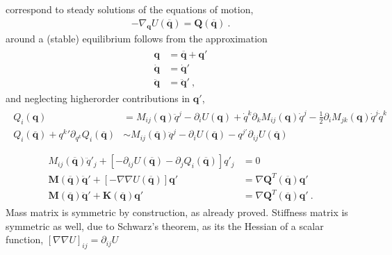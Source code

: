 \documentclass[letterpaper,10pt,english]{jupyterBook}
\begin{document}
\sphinxAtStartPar
{} correspond to steady solutions of the equations of motion,
\begin{equation*}
\begin{split}-\nabla_{\mathbf{q}} U (\overline{\mathbf{q}}) = \mathbf{Q}(\overline{\mathbf{q}}) \ .\end{split}
\end{equation*}
\sphinxAtStartPar
{} around a (stable) equilibrium follows from the approximation
\begin{equation*}
\begin{split}\begin{aligned}
  \mathbf{q}        & = \overline{\mathbf{q}} + \mathbf{q}'  \\
  \dot{\mathbf{q}}  & =                    \dot{\mathbf{q}}' \\
  \ddot{\mathbf{q}} & =                   \ddot{\mathbf{q}}' \ ,
\end{aligned}\end{split}
\end{equation*}
\sphinxAtStartPar
and neglecting higher\sphinxhyphen{}order contributions in \(\mathbf{q}'\),
\begin{equation*}
\begin{split}\begin{aligned}
Q_i (\mathbf{q})
  & = M_{ij}(\mathbf{q}) \ddot{q}^j - \partial_i U(\mathbf{q}) + \dot{q}^k \partial_k M_{ij}(\mathbf{q}) \dot{q}^j - \frac{1}{2} \partial_i M_{jk}(\mathbf{q}) \dot{q}^j \dot{q}^k  \\
  Q_i(\overline{\mathbf{q}}) + {q^{k}}' \partial_{q^k} Q_i(\overline{\mathbf{q}}) & \sim M_{ij}(\overline{\mathbf{q}}) \ddot{q}^j - \partial_i U(\overline{\mathbf{q}}) - q^{j'} \partial_{ij} U(\overline{\mathbf{q}}) \\
\end{aligned}\end{split}
\end{equation*}\begin{equation*}
\begin{split}\begin{aligned}
    M_{ij}(\overline{\mathbf{q}}) \ddot{q}'_j + \left[ - \partial_{ij} U(\overline{\mathbf{q}}) - \partial_j Q_i(\overline{\mathbf{q}}) \right] q'_j  & = 0 \\
    \mathbf{M}(\overline{\mathbf{q}}) \ddot{\mathbf{q}}' + \left[ - \nabla \nabla U(\overline{\mathbf{q}}) \right] \mathbf{q}' & = \nabla \mathbf{Q}^T (\overline{\mathbf{q}}) \mathbf{q}' \\
    \mathbf{M}(\overline{\mathbf{q}}) \ddot{\mathbf{q}}' + \mathbf{K}(\overline{\mathbf{q}}) \mathbf{q}' & = \nabla \mathbf{Q}^T(\overline{\mathbf{q}})\mathbf{q}' \ .
\end{aligned}\end{split}
\end{equation*}
\sphinxAtStartPar
{} Mass matrix is symmetric by construction, as already proved. Stiffness matrix is symmetric as well, due to Schwarz’s theorem, as its the Hessian of a scalar function, \(\left[ \nabla \nabla U \right]_{ij} = \partial_{ij} U\)
\end{document}

